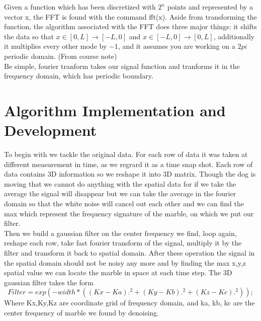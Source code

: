 \documentclass[12pt,letterpaper]{article}
\begin{document}
Given a function which has been discretized with $ 2^n $ points and represented by a vector x, the FFT is found with the command fft(x). Aside from transforming the function, the algorithm associated with the
FFT does three major things: it shifts the data so that $x \in [0, L] \rightarrow [−L, 0] 
$ and $x \in [−L, 0] \rightarrow [0, L] $, additionally it multiplies every other mode by −1, and
it assumes you are working on a $ 2pi $ periodic domain. (From course note)\\
Be simple, fourier tranform takes our signal function and tranforms it in the frequency domain, which has periodic boundary.







\section{Algorithm Implementation and Development}
To begin with we tackle the original data. For each row of data it was taken at different measurement in time, as we regrard it as a time snap shot. Each row of data contains 3D information so we reshape it into 3D matrix. Though the dog is moving that we cannot do anything with the spatial data for if we take the average the signal will disappear but we can take the average in the fourier domain so that the white noise will cancel out each other and we can find the max which represent the frequency signature of the marble, on which we put our filter.\\
Then we build a gaussian filter on the center frequency we find, loop again, reshape each row, take fast fourier transform of the signal, multiply it by the filter and transform it back to spatial domain. After these operation the signal in the spatial domain should not be noisy any more and by finding the max x,y,z spatial value we can locate the marble in space at each time step.
The 3D gaussian filter takes the form
\begin{equation}
    \label{Gaussian filter}
    Filter =  exp(-width*((Kx - Ka).^2+(Ky - Kb).^2+(Kz - Kc).^2));
\end{equation}
Where Kx,Ky,Kz are coordinate grid of frequency domain, and ka, kb, kc are the center frequency of marble we found by denoising.
\end{document}

